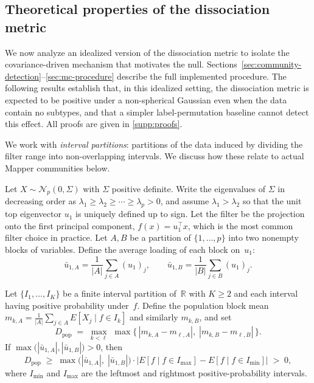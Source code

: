 \documentclass[hidelinks]{siamart251216}
\newcommand{\R}{\mathbb{R}}
\begin{document}
\subsection{Theoretical properties of the dissociation metric}\label{sec:theory}

We now analyze an idealized version of the dissociation metric to
isolate the covariance-driven mechanism that motivates the null.
Sections~\ref{sec:community-detection}--\ref{sec:mc-procedure} describe
the full implemented procedure.  The
following results establish that, in this idealized setting, the
dissociation metric is expected to be positive under a non-spherical
Gaussian even when the data contain no subtypes, and that a simpler
label-permutation baseline cannot detect this effect.  All
proofs are given in \cref{supp:proofs}.

We work with \emph{interval partitions}: partitions of the data
induced by dividing the filter range into non-overlapping intervals.
We discuss how these relate to actual Mapper communities below.

Let $X \sim \mathcal{N}_p(0, \Sigma)$ with $\Sigma$ positive definite.  Write the eigenvalues of $\Sigma$ in
decreasing order as $\lambda_1 \ge \lambda_2 \ge \cdots \ge \lambda_p > 0$,
and assume $\lambda_1 > \lambda_2$ so that the unit top eigenvector $u_1$ is
uniquely defined up to sign.  Let the filter be the projection onto the first
principal component, $f(x) = u_1^\top x$, which is the most common
filter choice in practice.  Let $A, B$ be a partition of
$\{1, \ldots, p\}$ into two nonempty blocks of variables.  Define the average loading of each block on~$u_1$:
\begin{equation}\label{eq:avg-loading}
  \bar{u}_{1,A} = \frac{1}{|A|} \sum_{j \in A} (u_1)_j, \qquad
  \bar{u}_{1,B} = \frac{1}{|B|} \sum_{j \in B} (u_1)_j.
\end{equation}

\begin{theorem}\label{thm:dissociation}
  Let $\{I_1,\ldots,I_K\}$ be a finite interval partition of~$\R$
  with $K \ge 2$ and each interval having positive probability
  under~$f$.  Define the population block mean
  $m_{k,A} = \frac{1}{|A|}\sum_{j \in A} E[X_j \mid f \in I_k]$ and
  similarly $m_{k,B}$, and set
  \begin{equation}\label{eq:dpop}
    D_{\mathrm{pop}}
    \;=\;
    \max_{k < \ell}\;
    \max\bigl\{\,|m_{k,A} - m_{\ell,A}|,\;
                  |m_{k,B} - m_{\ell,B}|\,\bigr\}.
  \end{equation}
  If $\max\bigl(|\bar{u}_{1,A}|,\allowbreak |\bar{u}_{1,B}|\bigr) > 0$, then
  \begin{equation}\label{eq:thm-bound}
    D_{\mathrm{pop}} \;\ge\; \max\!\bigl(|\bar{u}_{1,A}|,\;
    |\bar{u}_{1,B}|\bigr) \cdot
    \bigl|E[f \mid f \in I_{\max}] - E[f \mid f \in I_{\min}]\bigr|
    \;>\; 0,
  \end{equation}
  where $I_{\min}$ and $I_{\max}$ are the leftmost and rightmost
  positive-probability intervals.
\end{theorem}
\end{document}
